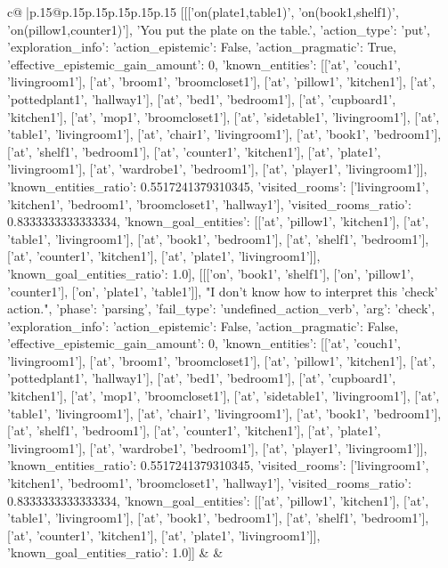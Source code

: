 \documentclass{article}
\begin{document}
{\begin{supertabular}{c@{$\;$}|p{.15\linewidth}@{}p{.15\linewidth}p{.15\linewidth}p{.15\linewidth}p{.15\linewidth}p{.15\linewidth}}
{{{	 [[['on(plate1,table1)', 'on(book1,shelf1)', 'on(pillow1,counter1)'], 'You put the plate on the table.', {'action_type': 'put', 'exploration_info': {'action_epistemic': False, 'action_pragmatic': True, 'effective_epistemic_gain_amount': 0, 'known_entities': [['at', 'couch1', 'livingroom1'], ['at', 'broom1', 'broomcloset1'], ['at', 'pillow1', 'kitchen1'], ['at', 'pottedplant1', 'hallway1'], ['at', 'bed1', 'bedroom1'], ['at', 'cupboard1', 'kitchen1'], ['at', 'mop1', 'broomcloset1'], ['at', 'sidetable1', 'livingroom1'], ['at', 'table1', 'livingroom1'], ['at', 'chair1', 'livingroom1'], ['at', 'book1', 'bedroom1'], ['at', 'shelf1', 'bedroom1'], ['at', 'counter1', 'kitchen1'], ['at', 'plate1', 'livingroom1'], ['at', 'wardrobe1', 'bedroom1'], ['at', 'player1', 'livingroom1']], 'known_entities_ratio': 0.5517241379310345, 'visited_rooms': ['livingroom1', 'kitchen1', 'bedroom1', 'broomcloset1', 'hallway1'], 'visited_rooms_ratio': 0.8333333333333334, 'known_goal_entities': [['at', 'pillow1', 'kitchen1'], ['at', 'table1', 'livingroom1'], ['at', 'book1', 'bedroom1'], ['at', 'shelf1', 'bedroom1'], ['at', 'counter1', 'kitchen1'], ['at', 'plate1', 'livingroom1']], 'known_goal_entities_ratio': 1.0}}], [[['on', 'book1', 'shelf1'], ['on', 'pillow1', 'counter1'], ['on', 'plate1', 'table1']], "I don't know how to interpret this 'check' action.", {'phase': 'parsing', 'fail_type': 'undefined_action_verb', 'arg': 'check', 'exploration_info': {'action_epistemic': False, 'action_pragmatic': False, 'effective_epistemic_gain_amount': 0, 'known_entities': [['at', 'couch1', 'livingroom1'], ['at', 'broom1', 'broomcloset1'], ['at', 'pillow1', 'kitchen1'], ['at', 'pottedplant1', 'hallway1'], ['at', 'bed1', 'bedroom1'], ['at', 'cupboard1', 'kitchen1'], ['at', 'mop1', 'broomcloset1'], ['at', 'sidetable1', 'livingroom1'], ['at', 'table1', 'livingroom1'], ['at', 'chair1', 'livingroom1'], ['at', 'book1', 'bedroom1'], ['at', 'shelf1', 'bedroom1'], ['at', 'counter1', 'kitchen1'], ['at', 'plate1', 'livingroom1'], ['at', 'wardrobe1', 'bedroom1'], ['at', 'player1', 'livingroom1']], 'known_entities_ratio': 0.5517241379310345, 'visited_rooms': ['livingroom1', 'kitchen1', 'bedroom1', 'broomcloset1', 'hallway1'], 'visited_rooms_ratio': 0.8333333333333334, 'known_goal_entities': [['at', 'pillow1', 'kitchen1'], ['at', 'table1', 'livingroom1'], ['at', 'book1', 'bedroom1'], ['at', 'shelf1', 'bedroom1'], ['at', 'counter1', 'kitchen1'], ['at', 'plate1', 'livingroom1']], 'known_goal_entities_ratio': 1.0}}]] 
	  } 
	   } 
	   } 
	 & & \\ 
 


\end{supertabular}}
\end{document}
